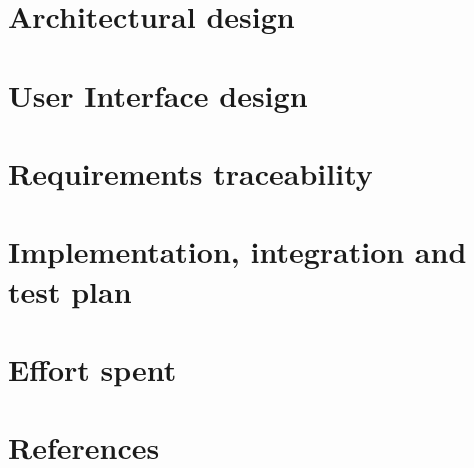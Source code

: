 \documentclass[11pt]{article}
\begin{document}
\section{Architectural design}


\clearpage
\section{User Interface design}
%

\clearpage
\section{Requirements traceability}
%

\clearpage
\section{Implementation, integration and test plan}
%

\clearpage
\section{Effort spent}


\clearpage
\section{References}
%
\end{document}
